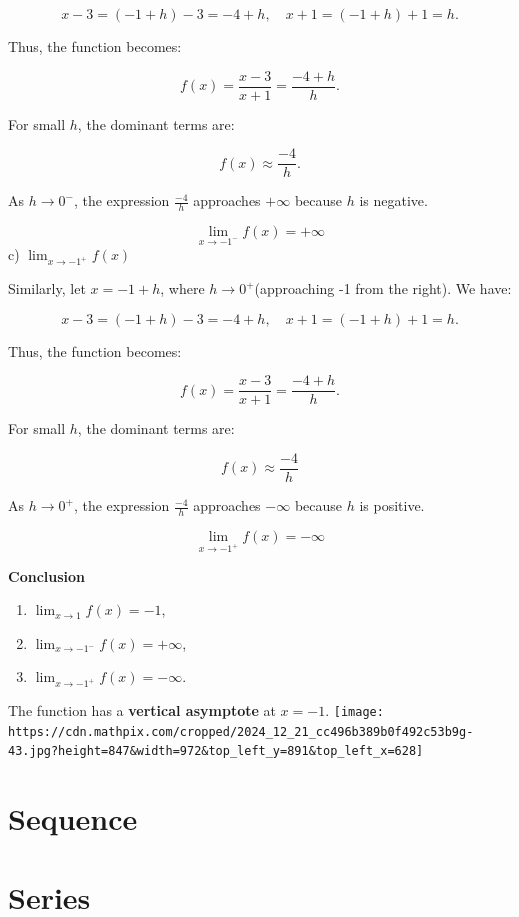 \documentclass[
]{book}
\providecommand{\tightlist}{%
  \setlength{\itemsep}{0pt}\setlength{\parskip}{0pt}}
\theoremstyle{definition}
\theoremstyle{definition}
\theoremstyle{definition}
\theoremstyle{definition}
\theoremstyle{remark}
\begin{document}
\[
x-3=(-1+h)-3=-4+h, \quad x+1=(-1+h)+1=h .
\]

Thus, the function becomes:

\[
f(x)=\frac{x-3}{x+1}=\frac{-4+h}{h} .
\]

For small \(h\), the dominant terms are:

\[
f(x) \approx \frac{-4}{h} .
\]

As \(h \rightarrow 0^{-}\), the expression \(\frac{-4}{h}\) approaches \(+\infty\) because \(h\) is negative.

\[
\lim _{x \rightarrow-1^{-}} f(x)=+\infty
\]
c) \(\lim _{x \rightarrow-1^{+}} f(x)\)

Similarly, let \(x=-1+h\), where \(h \rightarrow 0^{+}\)(approaching -1 from the right). We have:

\[
x-3=(-1+h)-3=-4+h, \quad x+1=(-1+h)+1=h .
\]

Thus, the function becomes:

\[
f(x)=\frac{x-3}{x+1}=\frac{-4+h}{h} .
\]

For small \(h\), the dominant terms are:

\[
f(x) \approx \frac{-4}{h}
\]

As \(h \rightarrow 0^{+}\), the expression \(\frac{-4}{h}\) approaches \(-\infty\) because \(h\) is positive.

\[
\lim _{x \rightarrow-1^{+}} f(x)=-\infty
\]

\textbf{Conclusion}

\begin{enumerate}
\def\labelenumi{\alph{enumi})}
\tightlist
\item
  \(\lim _{x \rightarrow 1} f(x)=-1\),
\item
  \(\lim _{x \rightarrow-1^{-}} f(x)=+\infty\),
\item
  \(\lim _{x \rightarrow-1^{+}} f(x)=-\infty\).
\end{enumerate}

The function has a \textbf{vertical asymptote} at \(x=-1\).
\texttt{[image: https://cdn.mathpix.com/cropped/2024\_12\_21\_cc496b389b0f492c53b9g-43.jpg?height=847\&width=972\&top\_left\_y=891\&top\_left\_x=628]}

\chapter{Sequence}\label{sequence}

\chapter{Series}\label{series}
\end{document}
